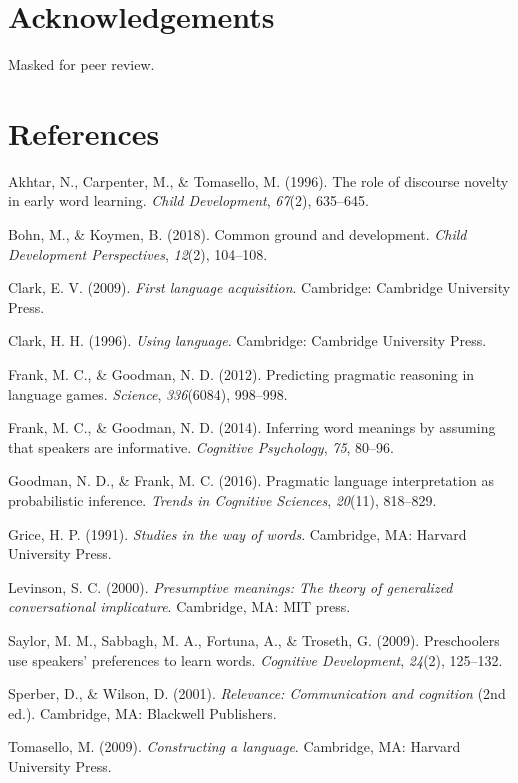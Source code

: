 \documentclass[10pt, letterpaper]{article}
\begin{document}
\section{Acknowledgements}\label{acknowledgements}

Masked for peer review.

\section{References}\label{references}

\setlength{\parindent}{-0.1in} \setlength{\leftskip}{0.125in} \noindent

\hypertarget{refs}{}
\hypertarget{ref-akhtar1996role}{}
Akhtar, N., Carpenter, M., \& Tomasello, M. (1996). The role of
discourse novelty in early word learning. \emph{Child Development},
\emph{67}(2), 635--645.

\hypertarget{ref-bohn2018common}{}
Bohn, M., \& Koymen, B. (2018). Common ground and development.
\emph{Child Development Perspectives}, \emph{12}(2), 104--108.

\hypertarget{ref-clark2009first}{}
Clark, E. V. (2009). \emph{First language acquisition}. Cambridge:
Cambridge University Press.

\hypertarget{ref-clark1996using}{}
Clark, H. H. (1996). \emph{Using language}. Cambridge: Cambridge
University Press.

\hypertarget{ref-frank2012predicting}{}
Frank, M. C., \& Goodman, N. D. (2012). Predicting pragmatic reasoning
in language games. \emph{Science}, \emph{336}(6084), 998--998.

\hypertarget{ref-frank2014inferring}{}
Frank, M. C., \& Goodman, N. D. (2014). Inferring word meanings by
assuming that speakers are informative. \emph{Cognitive Psychology},
\emph{75}, 80--96.

\hypertarget{ref-goodman2016pragmatic}{}
Goodman, N. D., \& Frank, M. C. (2016). Pragmatic language
interpretation as probabilistic inference. \emph{Trends in Cognitive
Sciences}, \emph{20}(11), 818--829.

\hypertarget{ref-grice1991studies}{}
Grice, H. P. (1991). \emph{Studies in the way of words}. Cambridge, MA:
Harvard University Press.

\hypertarget{ref-levinson2000presumptive}{}
Levinson, S. C. (2000). \emph{Presumptive meanings: The theory of
generalized conversational implicature}. Cambridge, MA: MIT press.

\hypertarget{ref-saylor2009preschoolers}{}
Saylor, M. M., Sabbagh, M. A., Fortuna, A., \& Troseth, G. (2009).
Preschoolers use speakers' preferences to learn words. \emph{Cognitive
Development}, \emph{24}(2), 125--132.

\hypertarget{ref-sperber2001relevance}{}
Sperber, D., \& Wilson, D. (2001). \emph{Relevance: Communication and
cognition} (2nd ed.). Cambridge, MA: Blackwell Publishers.

\hypertarget{ref-tomasello2009constructing}{}
Tomasello, M. (2009). \emph{Constructing a language}. Cambridge, MA:
Harvard University Press.


\end{document}
